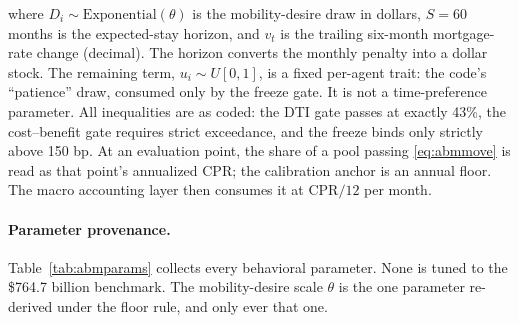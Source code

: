 \documentclass[12pt]{article}
\begin{document}
where $D_i \sim \mathrm{Exponential}(\theta)$ is the mobility-desire draw in dollars, $S = 60$ months is the expected-stay horizon, and $v_t$ is the trailing six-month mortgage-rate change (decimal). The horizon converts the monthly penalty into a dollar stock. The remaining term, $u_i \sim U[0,1]$, is a fixed per-agent trait: the code's ``patience'' draw, consumed only by the freeze gate. It is not a time-preference parameter. %
All inequalities are as coded: the DTI gate passes at exactly 43\%, the cost--benefit gate requires strict exceedance, and the freeze binds only strictly above 150 bp. At an evaluation point, the share of a pool passing \eqref{eq:abmmove} is read as that point's annualized CPR; the calibration anchor is an annual floor. The macro accounting layer then consumes it at $\mathrm{CPR}/12$ per month. %

\paragraph{Parameter provenance.}
Table~\ref{tab:abmparams} collects every behavioral parameter. None is tuned to the \$764.7 billion benchmark. The mobility-desire scale $\theta$ is the one parameter re-derived under the floor rule, and only ever that one.
\end{document}
